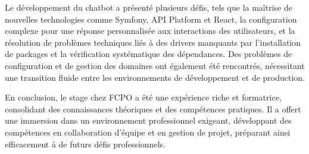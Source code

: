 Le développement du chatbot a présenté plusieurs défis, tels que la maîtrise de nouvelles technologies comme Symfony, API Platform et React, la configuration complexe pour une réponse personnalisée aux interactions des utilisateurs, et la résolution de problèmes techniques liés à des drivers manquants par l’installation de packages et la vérification systématique des dépendances. Des problèmes de configuration et de gestion des domaines ont également été rencontrés, nécessitant une transition fluide entre les environnements de développement et de production.

En conclusion, le stage chez FCPO a été une expérience riche et formatrice, consolidant des connaissances théoriques et des compétences pratiques. Il a offert une immersion dans un environnement professionnel exigeant, développant des compétences en collaboration d’équipe et en gestion de projet, préparant ainsi efficacement à de futurs défis professionnels.

%
